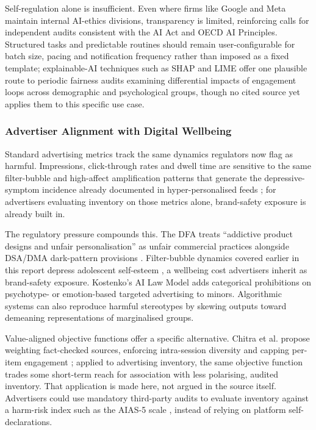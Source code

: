\documentclass[11pt]{article}
\begin{document}
Self-regulation alone is insufficient. Even where firms like Google and Meta maintain internal AI-ethics divisions, transparency is limited, reinforcing calls \parencites[1753]{7461574} for independent audits consistent with the AI Act and OECD AI Principles. Structured tasks and predictable routines should remain user-configurable for batch size, pacing and notification frequency rather than imposed as a fixed template; explainable-AI techniques such as SHAP and LIME \parencites[66]{2855351} offer one plausible route to periodic fairness audits examining differential impacts of engagement loops across demographic and psychological groups, though no cited source yet applies them to this specific use case.

\subsubsection{Advertiser Alignment with Digital Wellbeing}
\label{sec:advertiser_alignment_digital_wellbeing}
Standard advertising metrics track the same dynamics regulators now flag as harmful. Impressions, click-through rates and dwell time are sensitive to the same filter-bubble and high-affect amplification patterns that generate the depressive-symptom incidence already documented in hyper-personalised feeds \parencites[20]{3303310}; for advertisers evaluating inventory on those metrics alone, brand-safety exposure is already built in.

The regulatory pressure compounds this. The DFA treats ``addictive product designs and unfair personalisation'' as unfair commercial practices alongside DSA/DMA dark-pattern provisions \parencites[390]{7896734}. Filter-bubble dynamics covered earlier in this report depress adolescent self-esteem \parencites[3]{3303310}, a wellbeing cost advertisers inherit as brand-safety exposure. Kostenko's AI Law Model adds categorical prohibitions \parencites[217]{2977039} on psychotype- or emotion-based targeted advertising to minors. Algorithmic systems can also reproduce harmful stereotypes \parencites[4]{3278906} by skewing outputs toward demeaning representations of marginalised groups.

Value-aligned objective functions offer a specific alternative. Chitra et al. propose weighting fact-checked sources, enforcing intra-session diversity and capping per-item engagement \parencites[2252]{6502223}; applied to advertising inventory, the same objective function trades some short-term reach for association with less polarising, audited inventory. That application is made here, not argued in the source itself. Advertisers could use mandatory third-party audits to evaluate inventory against a harm-risk index such as the AIAS-5 scale \parencites[20]{3303310}, instead of relying on platform self-declarations.
\end{document}
